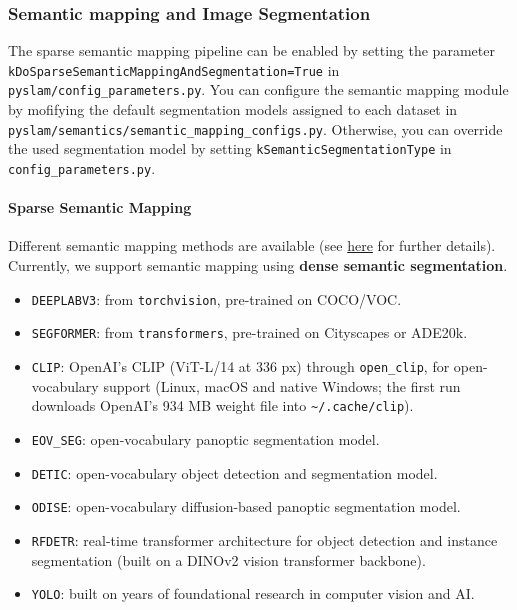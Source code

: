 \documentclass{article}
\let\oldparagraph\paragraph
\renewcommand{\paragraph}[1]{\oldparagraph{#1}\mbox{}}
\begin{document}
\hypertarget{semantic-mapping-and-image-segmentation}{%
\subsubsection{Semantic mapping and Image
Segmentation}\label{semantic-mapping-and-image-segmentation}}

The sparse semantic mapping pipeline can be enabled by setting the
parameter \texttt{kDoSparseSemanticMappingAndSegmentation=True} in
\texttt{pyslam/config\_parameters.py}. You can configure the semantic
mapping module by mofifying the default segmentation models assigned to
each dataset in \texttt{pyslam/semantics/semantic\_mapping\_configs.py}.
Otherwise, you can override the used segmentation model by setting
\texttt{kSemanticSegmentationType} in \texttt{config\_parameters.py}.

\hypertarget{sparse-semantic-mapping}{%
\paragraph{Sparse Semantic Mapping}\label{sparse-semantic-mapping}}

Different semantic mapping methods are available (see
\href{https://github.com/luigifreda/pyslam/blob/master/docs/semantics.md}{here} for further details). Currently, we
support semantic mapping using \textbf{dense semantic segmentation}. 
\begin{itemize}
\item \texttt{DEEPLABV3}: from \texttt{torchvision}, pre-trained on COCO/VOC.
\item \texttt{SEGFORMER}: from \texttt{transformers}, pre-trained on Cityscapes or ADE20k.
\item \texttt{CLIP}: OpenAI's CLIP (ViT-L/14 at 336 px) through \texttt{open\_clip}, for open-vocabulary support (Linux, macOS and native Windows; the first run downloads OpenAI's 934 MB weight file into \texttt{\textasciitilde/.cache/clip}).
\item \texttt{EOV\_SEG}: open-vocabulary panoptic segmentation model.
\item \texttt{DETIC}: open-vocabulary object detection and segmentation model.
\item \texttt{ODISE}: open-vocabulary diffusion-based panoptic segmentation model.
\item \texttt{RFDETR}: real-time transformer architecture for object detection and instance segmentation (built on a DINOv2 vision transformer backbone). 
\item \texttt{YOLO}: built on years of foundational research in computer vision and AI. 
\end{itemize}
\end{document}
